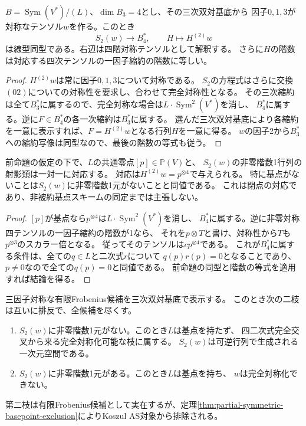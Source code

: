 \begin{proposition}[残る対称化空間と四次双対]\label{prop:partial-symmetrizer-quartics}
$B=\operatorname{Sym}(V^*)/(L)$、$\dim B_3=4$とし、その三次双対基底から
因子$0,1,3$が対称なテンソル$w$を作る。このとき
\[
 S_2(w)\longrightarrow B_4^*,\qquad H\longmapsto H^{(2)}w
\]
は線型同型である。右辺は四階対称テンソルとして解釈する。
さらに$H$の階数は対応する四次テンソルの一因子縮約の階数に等しい。
\end{proposition}
\begin{proof}
$H^{(2)}w$は常に因子$0,1,3$について対称である。
$S_2$の方程式はさらに交換$(02)$についての対称性を要求し、合わせて完全対称性となる。
その三次縮約は全て$B_3^*$に属するので、完全対称な場合は$L\cdot\operatorname{Sym}^2(V^*)$を消し、
$B_4^*$に属する。逆に$F\in B_4^*$の各一次縮約は$B_3^*$に属する。
選んだ三次双対基底により各縮約を一意に表示すれば、$F=H^{(2)}w$となる行列$H$を一意に得る。
$w$の因子2から$B_3^*$への縮約写像は同型なので、最後の階数の等式も従う。
\end{proof}
\begin{corollary}\label{cor:basepoint-rank-one-symmetrizer}
前命題の仮定の下で、$L$の共通零点$[p]\in\mathbb P(V)$と、
$S_2(w)$の非零階数1行列の射影類は一対一に対応する。
対応は$H^{(2)}w=p^{\otimes4}$で与えられる。
特に基点がないことは$S_2(w)$に非零階数1元がないことと同値である。
これは閉点の対応であり、非被約基点スキームの同定までは主張しない。
\end{corollary}
\begin{proof}
$[p]$が基点なら$p^{\otimes4}$は$L\cdot\operatorname{Sym}^2(V^*)$を消し、
$B_4^*$に属する。逆に非零対称四テンソルの一因子縮約の階数が1なら、
それを$p\otimes T$と書け、対称性から$T$も$p^{\otimes3}$のスカラー倍となる。
従ってそのテンソルは$c p^{\otimes4}$である。
これが$B_4^*$に属する条件は、全ての$q\in L$と二次式$r$について
$q(p)r(p)=0$となることであり、$p\ne0$なので全ての$q(p)=0$と同値である。
前命題の同型と階数の等式を適用すれば結論を得る。
\end{proof}
\begin{corollary}[三因子対称Frobenius候補の尽くされた二分岐]
\label{cor:partial-symmetric-exhaustive-split}
三因子対称な有限Frobenius候補を三次双対基底で表示する。
このとき次の二枝は互いに排反で、全候補を尽くす。
\begin{enumerate}
\item $S_2(w)$に非零階数1元がない。このとき$L$は基点を持たず、
四二次式完全交叉から来る完全対称化可能な枝に属する。
$S_2(w)$は可逆行列で生成される一次元空間である。
\item $S_2(w)$に非零階数1元がある。このとき$L$は基点を持ち、
$w$は完全対称化できない。
\end{enumerate}
第二枝は有限Frobenius候補として実在するが、定理\ref{thm:partial-symmetric-basepoint-exclusion}によりKoszul AS対象から排除される。
\end{corollary}
